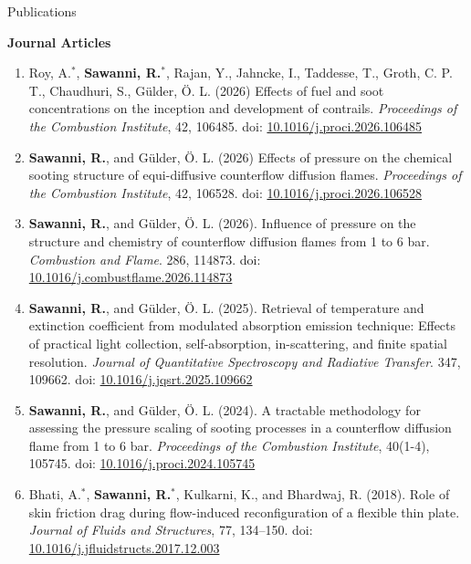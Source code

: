\documentclass[11pt,a4paper]{article}
\renewcommand{\thefootnote}{\fnsymbol{footnote}}
\begin{document}
	
	\begin{sectionbanner}{Publications}
	\end{sectionbanner}
	\noindent\textbf{Journal Articles}
	\begin{enumerate}
	    \item {Roy, A.$^*$, \textbf{Sawanni, R.}$^*$, Rajan, Y., Jahncke, I., Taddesse, T., Groth, C. P. T., Chaudhuri, S., G\"{u}lder, \"{O}. L. (2026) Effects of fuel and soot concentrations on the inception and development of contrails. \emph{Proceedings of the Combustion Institute}, 42, 106485. doi: \href{https://doi.org/10.1016/j.proci.2026.106485}{10.1016/j.proci.2026.106485}} 
	    \item {\textbf{Sawanni, R.}, and G\"{u}lder, \"{O}. L. (2026) Effects of pressure on the chemical sooting structure of equi-diffusive counterflow diffusion flames. \emph{Proceedings of the Combustion Institute}, 42, 106528. doi: \href{https://doi.org/10.1016/j.proci.2026.106528}{10.1016/j.proci.2026.106528}}
	    \item {\textbf{Sawanni, R.}, and G\"{u}lder, \"{O}. L. (2026). Influence of pressure on the structure and chemistry of counterflow diffusion flames from 1 to 6 bar. \emph{Combustion and Flame}. 286, 114873. doi: \href{https://doi.org/10.1016/j.combustflame.2026.114873}{10.1016/j.combustflame.2026.114873}}
	    \item {\textbf{Sawanni, R.}, and G\"{u}lder, \"{O}. L. (2025). Retrieval of temperature and extinction coefficient from modulated absorption emission technique: Effects of practical light collection, self-absorption, in-scattering, and finite spatial resolution. \emph{Journal of Quantitative Spectroscopy and Radiative Transfer}. 347, 109662. doi: \href{https://doi.org/10.1016/j.jqsrt.2025.109662}{10.1016/j.jqsrt.2025.109662}}
	    \item {\textbf{Sawanni, R.}, and G\"{u}lder, \"{O}. L. (2024). A tractable methodology for assessing the pressure scaling of sooting processes in a counterflow diffusion flame from 1 to 6 bar. \emph{Proceedings of the Combustion Institute}, 40(1-4), 105745. doi: \href{https://doi.org/10.1016/j.proci.2024.105745}{10.1016/j.proci.2024.105745}}
	    \item {Bhati, A.$^*$, \textbf{Sawanni, R.}$^*$, Kulkarni, K., and Bhardwaj, R. (2018). Role of skin friction drag during flow-induced reconfiguration of a flexible thin plate. \emph{Journal of Fluids and Structures}, {77}, 134--150. doi: \href{https://doi.org/10.1016/j.jfluidstructs.2017.12.003}{10.1016/j.jfluidstructs.2017.12.003}}
		\end{enumerate}
		\def\thefootnote{*}
		
\end{document}
